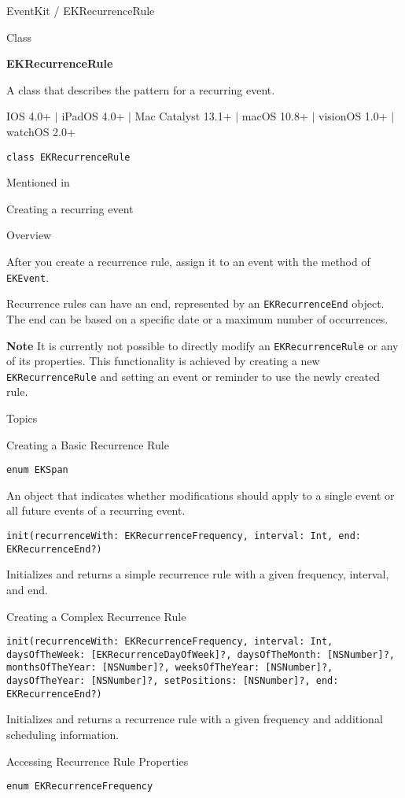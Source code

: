 \documentclass{article}
\title{}
\author{}
\date{}
\begin{document}
EventKit / EKRecurrenceRule

Class

\textbf{EKRecurrenceRule}

A class that describes the pattern for a recurring event.

IOS 4.0+ $|$ iPadOS 4.0+ $|$ Mac Catalyst 13.1+ $|$ macOS 10.8+ $|$ visionOS 1.0+ $|$ watchOS 2.0+

\texttt{class EKRecurrenceRule}

Mentioned in

Creating a recurring event

Overview

After you create a recurrence rule, assign it to an event with the method of \texttt{EKEvent}.

Recurrence rules can have an end, represented by an \texttt{EKRecurrenceEnd} object. The end can be based on a specific date or a maximum number of occurrences.

\textbf{Note}
It is currently not possible to directly modify an \texttt{EKRecurrenceRule} or any of its properties. This functionality is achieved by creating a new \texttt{EKRecurrenceRule} and setting an event or reminder to use the newly created rule.

Topics

Creating a Basic Recurrence Rule

\texttt{enum EKSpan}

An object that indicates whether modifications should apply to a single event or all future events of a recurring event.

\texttt{init(recurrenceWith: EKRecurrenceFrequency, interval: Int, end: EKRecurrenceEnd?)}

Initializes and returns a simple recurrence rule with a given frequency, interval, and end.

Creating a Complex Recurrence Rule

\texttt{init(recurrenceWith: EKRecurrenceFrequency, interval: Int, daysOfTheWeek: [EKRecurrenceDayOfWeek]?, daysOfTheMonth: [NSNumber]?, monthsOfTheYear: [NSNumber]?, weeksOfTheYear: [NSNumber]?, daysOfTheYear: [NSNumber]?, setPositions: [NSNumber]?, end: EKRecurrenceEnd?)}

Initializes and returns a recurrence rule with a given frequency and additional scheduling information.

Accessing Recurrence Rule Properties

\texttt{enum EKRecurrenceFrequency}
\end{document}
